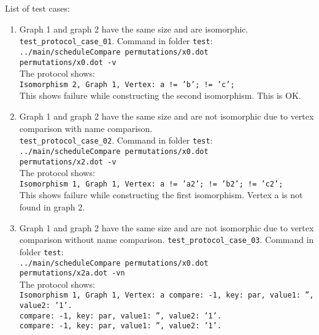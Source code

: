 \documentclass[12pt,a4paper]{report}
\begin{document}
List of test cases:
\begin{enumerate}
  \item Graph 1 and graph 2 have the same size and are isomorphic. \\
    \texttt{test\_protocol\_case\_01}. Command in folder \texttt{test}: \\
    \texttt{../main/scheduleCompare permutations/x0.dot \\ permutations/x0.dot -v} \\
    The protocol shows: \\
    \texttt{Isomorphism 2, Graph 1, Vertex: a != 'b'; != 'c';} \\
    This shows failure while constructing the second isomorphism. This is OK.
  \item Graph 1 and graph 2 have the same size and are not isomorphic due to vertex comparison with name comparison. \\
    \texttt{test\_protocol\_case\_02}. Command in folder \texttt{test}: \\
    \texttt{../main/scheduleCompare permutations/x0.dot \\ permutations/x2.dot -v} \\
    The protocol shows: \\
    \texttt{Isomorphism 1, Graph 1, Vertex: a != 'a2'; != 'b2'; != 'c2';} \\
    This shows failure while constructing the first isomorphism. Vertex a is not found in graph 2.
  \item Graph 1 and graph 2 have the same size and are not isomorphic due to vertex comparison without name comparison.
    \texttt{test\_protocol\_case\_03}. Command in folder \texttt{test}: \\
    \texttt{../main/scheduleCompare permutations/x0.dot \\ permutations/x2a.dot -vn} \\
    The protocol shows: \\
    \texttt{Isomorphism 1, Graph 1, Vertex: a compare: -1, key: par, value1: '', value2: '1'. \\
    compare: -1, key: par, value1: '', value2: '1'. \\
    compare: -1, key: par, value1: '', value2: '1'.} \\
    

\end{enumerate}
\end{document}
